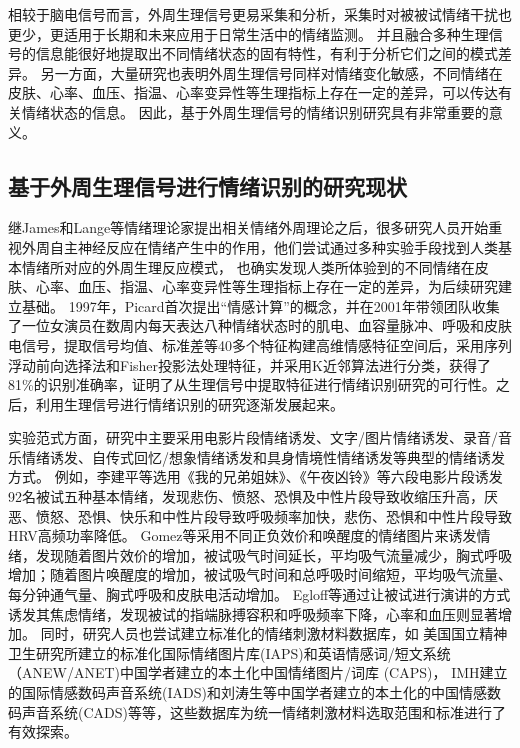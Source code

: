 相较于脑电信号而言，外周生理信号更易采集和分析，采集时对被被试情绪干扰也更少，更适用于长期和未来应用于日常生活中的情绪监测。
并且融合多种生理信号的信息能很好地提取出不同情绪状态的固有特性，有利于分析它们之间的模式差异。
另一方面，大量研究也表明外周生理信号同样对情绪变化敏感，不同情绪在皮肤、心率、血压、指温、心率变异性等生理指标上存在一定的差异\cite{Kreibig2010}，可以传达有关情绪状态的信息。
因此，基于外周生理信号的情绪识别研究具有非常重要的意义。

\subsection{基于外周生理信号进行情绪识别的研究现状}
继James和Lange等情绪理论家\cite{James1884,Malatesta1987}提出相关情绪外周理论之后，很多研究人员开始重视外周自主神经反应在情绪产生中的作用，他们尝试通过多种实验手段找到人类基本情绪所对应的外周生理反应模式，
也确实发现人类所体验到的不同情绪在皮肤、心率、血压、指温、心率变异性等生理指标上存在一定的差异\cite{Kreibig2010}，为后续研究建立基础。
1997年，Picard\cite{Picard1997}首次提出“情感计算”的概念，并在2001年带领团队\cite{Picard2001}收集了一位女演员在数周内每天表达八种情绪状态时的肌电、血容量脉冲、呼吸和皮肤电信号，提取信号均值、标准差等40多个特征构建高维情感特征空间后，采用序列浮动前向选择法和Fisher投影法处理特征，并采用K近邻算法进行分类，获得了81\%的识别准确率，证明了从生理信号中提取特征进行情绪识别研究的可行性。之后，利用生理信号进行情绪识别的研究逐渐发展起来。

实验范式方面，研究中主要采用电影片段情绪诱发、文字/图片情绪诱发、录音/音乐情绪诱发、自传式回忆/想象情绪诱发和具身情境性情绪诱发等典型的情绪诱发方式。
例如，李建平等\cite{LiJianping2006}选用《我的兄弟姐妹》、《午夜凶铃》等六段电影片段诱发92名被试五种基本情绪，发现悲伤、愤怒、恐惧及中性片段导致收缩压升高，厌恶、愤怒、恐惧、快乐和中性片段导致呼吸频率加快，悲伤、恐惧和中性片段导致HRV高频功率降低。
Gomez等\cite{Gomez2004}采用不同正负效价和唤醒度的情绪图片来诱发情绪，发现随着图片效价的增加，被试吸气时间延长，平均吸气流量减少，胸式呼吸增加；随着图片唤醒度的增加，被试吸气时间和总呼吸时间缩短，平均吸气流量、每分钟通气量、胸式呼吸和皮肤电活动增加。
Egloff等\cite{Egloff2002}通过让被试进行演讲的方式诱发其焦虑情绪，发现被试的指端脉搏容积和呼吸频率下降，心率和血压则显著增加。
同时，研究人员也尝试建立标准化的情绪刺激材料数据库，如
美国国立精神卫生研究所建立的标准化国际情绪图片库(IAPS)和英语情感词/短文系统（ANEW/ANET)中国学者\cite{BaiLu2005}建立的本土化中国情绪图片/词库 (CAPS)，
IMH建立的国际情感数码声音系统(IADS)和刘涛生等中国学者\cite{LiuTaosheng2006}建立的本土化的中国情感数码声音系统(CADS)等等，这些数据库为统一情绪刺激材料选取范围和标准进行了有效探索。

